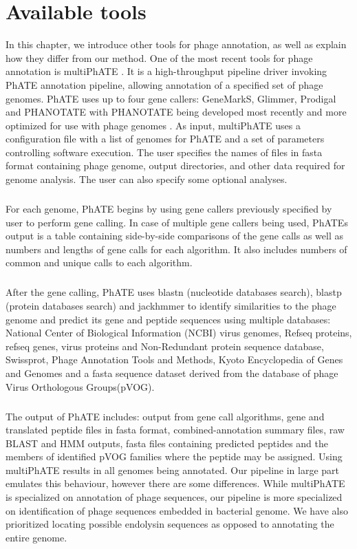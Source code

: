 \chapter{Available tools}

\label{kap:avtools} %

In this chapter, we introduce other tools for phage annotation, as well as explain how they differ from our method. One of the most recent tools for phage annotation is multiPhATE \cite{10.1093/bioinformatics/btz258}. It is a high-throughput pipeline driver invoking PhATE annotation pipeline, allowing annotation of a specified set of phage genomes. PhATE uses up to four gene callers: GeneMarkS, Glimmer, Prodigal and PHANOTATE with PHANOTATE being developed most recently and more optimized for use with phage genomes \cite{10.1093/bioinformatics/btz265}.
As input, multiPhATE uses a configuration file with a list of genomes for PhATE and a set of parameters controlling software execution. The user specifies the names of files in fasta format containing phage genome, output directories, and other data required for genome analysis. The user can also specify some optional analyses.
\paragraph*{}
For each genome, PhATE begins by using gene callers previously specified by user to perform gene calling. In case of multiple gene callers being used, PhATEs output is a table containing side-by-side comparisons of the gene calls as well as numbers and lengths of gene calls for each algorithm. It also includes numbers of common and unique calls to each algorithm. 
\paragraph*{}
After the gene calling, PhATE uses blastn (nucleotide databases search), blastp (protein databases search) and jackhmmer to identify similarities to the phage genome and predict its gene and peptide sequences using multiple databases: National Center of Biological Information (NCBI) virus genomes, Refseq proteins, refseq genes, virus proteins and Non-Redundant protein sequence database, Swissprot, Phage Annotation Tools and Methods, Kyoto Encyclopedia of Genes and Genomes and a fasta sequence dataset derived from the database of phage Virus Orthologous Groups(pVOG).
\paragraph*{}
The output of PhATE includes: output from gene call algorithms, gene and translated peptide files in fasta format, combined-annotation summary files, raw BLAST and HMM outputs, fasta files containing predicted peptides and the members of identified pVOG families where the peptide may be assigned. Using multiPhATE results in all genomes being annotated.
Our pipeline in large part emulates this behaviour, however there are some differences. While multiPhATE is specialized on annotation of phage sequences, our pipeline is more specialized on identification of phage sequences embedded in bacterial genome. We have also prioritized locating possible endolysin sequences as opposed to annotating the entire genome.